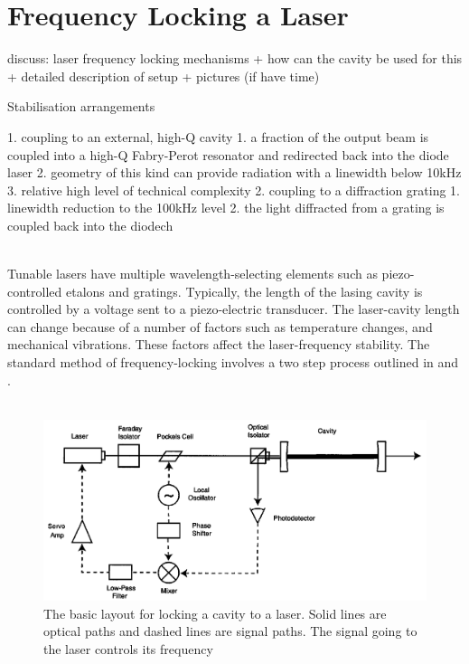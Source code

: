 \documentclass[11pt,A4Paper]{article}
\begin{document}
\section{Frequency Locking a Laser}
discuss: laser frequency locking mechanisms + how can the cavity be used for this + detailed description of setup + pictures (if have time)

Stabilisation arrangements 

1. coupling to an external, high-Q cavity
    1. a fraction of the output beam is coupled into a high-Q Fabry-Perot resonator and redirected back into the diode laser
    2. geometry of this kind can provide radiation with a linewidth below 10kHz 
    3. relative high level of technical complexity 
2. coupling to a diffraction grating
    1. linewidth reduction to the 100kHz level
    2. the light diffracted from a grating is coupled back into the diodech

\\

Tunable lasers have multiple wavelength-selecting elements such as piezo-controlled etalons and gratings. Typically, the length of the lasing cavity is controlled by a voltage sent to a piezo-electric transducer. The laser-cavity length can change because of a number of factors such as temperature changes, and mechanical vibrations. These factors affect the laser-frequency stability. The standard method of frequency-locking involves a two step process outlined in \cite{PDH1983} and \cite{PDHintro}. 
\\
\\

\begin{figure}[H]
    \centering
    \includegraphics[width=\textwidth]{PDHlayout.png}
    \caption{The basic layout for locking a cavity to a laser. Solid lines are optical paths and dashed lines are signal paths. The signal going to the laser controls its frequency \cite{PDHintro}}
    \label{fig:PDHlayout}
\end{figure}
\end{document}
